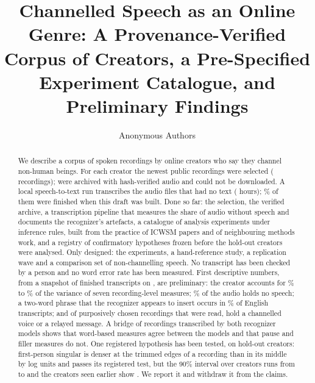 \documentclass[letterpaper]{article} %
\title{Channelled Speech as an Online Genre: A Provenance-Verified Corpus of \NCreators{} Creators, a Pre-Specified Experiment Catalogue, and Preliminary Findings}
\author{Anonymous Authors}
\begin{document}
\maketitle

\begin{abstract}
We describe a corpus of spoken recordings by \NCreators{} online creators who say they channel non-human beings. For each creator the newest \NPerCreator{} public recordings were selected (\NSelected{} recordings); \NArchived{} were archived with hash-verified audio and \NFailed{} could not be downloaded. A local speech-to-text run transcribes the \NRunAudio{} audio files that had no text (\RunHoursRounded{} hours); \NowPctAudio\% of them were finished when this draft was built. Done so far: the selection, the verified archive, a transcription pipeline that measures the share of audio without speech and documents the recognizer's artefacts, a catalogue of \NExperiments{} analysis experiments under \NRules{} inference rules, built from the practice of ICWSM papers and of neighbouring methods work, and a registry of \NMaxConfirmatory{} confirmatory hypotheses frozen before the hold-out creators were analysed. Only designed: the \NExperiments{} experiments, a hand-reference study, a replication wave and a comparison set of non-channelling speech. No transcript has been checked by a person and no word error rate has been measured. First descriptive numbers, from a snapshot of \SnapLines{} finished transcripts on \SnapDate, are preliminary: the creator accounts for \IccMinPct\% to \IccMaxPct\% of the variance of seven recording-level measures; \SnapNonSpeechPct\% of the audio holds no speech; a two-word phrase that the recognizer appears to insert occurs in \ThanksPct\% of English transcripts; and of \ReadLongN{} purposively chosen recordings that were read, \KindChannelled{} hold a channelled voice or a relayed message. A bridge of \BridgePairs{} recordings transcribed by both recognizer models shows that word-based measures agree between the models and that pause and filler measures do not. One registered hypothesis has been tested, on \HThreeCreators{} hold-out creators: first-person singular is denser at the trimmed edges of a recording than in its middle by \HThreeU{} log units and passes its registered test, but the 90\% interval over creators runs from \HThreeLo{} to \HThreeHi{} and the \HThreeSeenCreators{} creators seen earlier show \HThreeSeenU. We report it and withdraw it from the claims.
\end{abstract}
\end{document}
